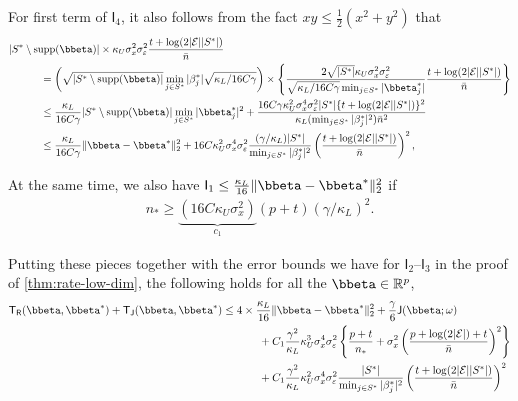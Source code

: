 \documentclass[10pt]{article}
\numberwithin{equation}{section}
\newcommand*{\supp}{\mathrm{supp}}
\begin{document}
For first term of $\mathsf{I}_4$, it also follows from the fact $xy \le \frac{1}{2}(x^2 + y^2)$ that
\begin{align*}
&|S^*\setminus \supp(\bbeta)| \times \kappa_U \sigma_x^2\sigma_\varepsilon^2  \frac{t+ \log(2|\mathcal{E}||S^*|)}{\bar{n}} \\
&~~~~~~~~~ = \left(\sqrt{|S^*\setminus \supp(\bbeta)|} \min_{j\in S^*}|\beta_j^*| \sqrt{\kappa_L/16C\gamma}\right) \times \left\{\frac{2\sqrt{|S^*|}\kappa_U \sigma_x^2\sigma_\varepsilon^2}{\sqrt{\kappa_L/16C\gamma} \min_{j\in S^*} |\bbeta_j^ *|}\frac{t+ \log(2|\mathcal{E}||S^*|)}{\bar{n}}\right\} \\
&~~~~~~~~~ \le \frac{\kappa_L}{16C\gamma} |S^*\setminus \supp(\bbeta)| \min_{j\in S^*} |\bbeta_j^*|^2 + \frac{16C \gamma \kappa_U^2 \sigma_x^4\sigma_\varepsilon^2 |S^*|\{t + \log(2|\mathcal{E}||S^*|)\}^2}{\kappa_L (\min_{j\in S^*} |\beta_j^*|^2) \bar{n}^2} \\
&~~~~~~~~~ \le  \frac{\kappa_L}{16C\gamma} \|\bbeta - \bbeta^*\|_2^2 + 16C \kappa_U^2 \sigma_x^4\sigma_\varepsilon^2 \frac{(\gamma/\kappa_L) |S^*|}{\min_{j\in S^*} |\beta_j^*|^2} \left(\frac{t + \log(2|\mathcal{E}||S^*|)}{\bar{n}}\right)^2, 
\end{align*} 

At the same time, we also have $\mathsf{I}_1 \le \frac{\kappa_L}{16} \|\bbeta - \bbeta^*\|_2^2$ if 
\begin{align}
\label{eq:low-dim-faster-rate-c1}
n_* \ge \underbrace{\left(16C \kappa_U \sigma_x^2\right)}_{c_1} (p + t) \left(\gamma/\kappa_L\right)^2.
\end{align}

Putting these pieces together with the error bounds we have for $\mathsf{I}_2$--$\mathsf{I}_3$ in the proof of \cref{thm:rate-low-dim}, the following holds for all the $\bbeta \in \mathbb{R}^p$,
\begin{align*}
\mathsf{T}_{\mathsf{R}}(\bbeta,\bbeta^*) + \mathsf{T}_{\mathsf{J}}(\bbeta, \bbeta^*) &\le 4\times \frac{\kappa_L}{16} \|\bbeta - \bbeta^*\|_2^2 + \frac{\gamma}{6} \mathsf{J}(\bbeta;\omega) \\
&~~~~~~~~~~ + C_1 \frac{\gamma^2}{\kappa_L} \kappa_U^3 \sigma_x^4 \sigma_\varepsilon^2 \left\{\frac{p + t}{n_*} + \sigma_x^2 \left(\frac{p + \log(2|\mathcal{E}|) + t}{\bar{n}}\right)^2 \right\} \\
&~~~~~~~~~~ + C_1 \frac{\gamma^2}{\kappa_L} \kappa_U^2 \sigma_x^4\sigma_\varepsilon^2 \frac{|S^*|}{\min_{j\in S^*} |\beta_j^*|^2} \left(\frac{t + \log(2|\mathcal{E}||S^*|)}{\bar{n}}\right)^2
\end{align*}
\end{document}
